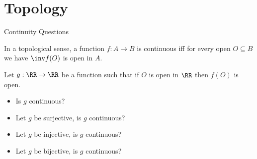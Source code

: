 \section{Topology}
\begin{boxProblem}{Continuity Questions}
    \begin{boxDefinition}{}
        In a topological sense,
        a function \( f : A \to B \) is continuous iff for every open \( O \subseteq B \) we have \( \inv f(O) \) is open in \( A \).
    \end{boxDefinition}
    Let \( g : \RR \to \RR \) be a function such that if \( O \) is open in \( \RR \) then \( f(O) \) is open.
    \begin{itemize}
        \item Is \( g \) continuous?
        \item Let \( g \) be surjective, is \( g \) continuous?
        \item Let \( g \) be injective, is \( g \) continuous?
        \item Let \( g \) be bijective, is \( g \) continuous?
    \end{itemize}

\end{boxProblem}
